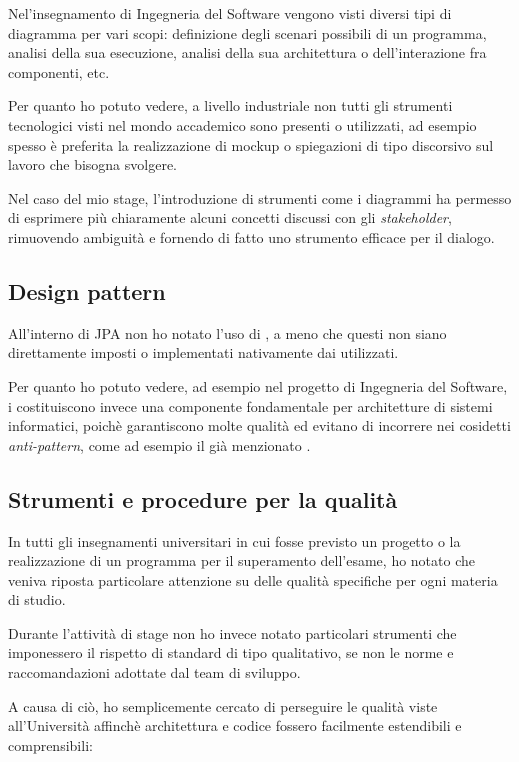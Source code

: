 Nel'insegnamento di Ingegneria del Software vengono visti diversi tipi di
diagramma  per vari scopi: definizione degli scenari possibili di un
programma, analisi della sua esecuzione, analisi della sua architettura o
dell'interazione fra componenti, etc.

Per quanto ho potuto vedere, a livello industriale non tutti gli strumenti
tecnologici visti nel mondo accademico sono presenti o utilizzati, ad esempio
spesso è preferita la realizzazione di mockup o spiegazioni di tipo discorsivo
sul lavoro che bisogna svolgere.

Nel caso del mio stage, l'introduzione di strumenti come i diagrammi
 ha permesso di esprimere più chiaramente alcuni concetti discussi
con gli \emph{stakeholder}, rimuovendo ambiguità e fornendo di fatto uno
strumento efficace per il dialogo.

\subsection{Design pattern}

All'interno di JPA non ho notato l'uso di , a meno che
questi non siano direttamente imposti o implementati nativamente dai
 utilizzati.

Per quanto ho potuto vedere, ad esempio nel progetto di Ingegneria del
Software, i  costituiscono invece una componente
fondamentale per architetture di sistemi informatici, poichè garantiscono
molte qualità ed evitano di incorrere nei cosidetti \emph{anti-pattern}, come
ad esempio il già menzionato .

\subsection{Strumenti e procedure per la qualità}

In tutti gli insegnamenti universitari in cui fosse previsto un progetto o la
realizzazione di un programma per il superamento dell'esame, ho notato che
veniva riposta particolare attenzione su delle qualità specifiche per ogni
materia di studio.

Durante l'attività di stage non ho invece notato particolari strumenti che
imponessero il rispetto di standard di tipo qualitativo, se non le norme e
raccomandazioni adottate dal team di sviluppo.

A causa di ciò, ho semplicemente cercato di perseguire le qualità viste
all'Università affinchè architettura e codice fossero facilmente estendibili e
comprensibili:

